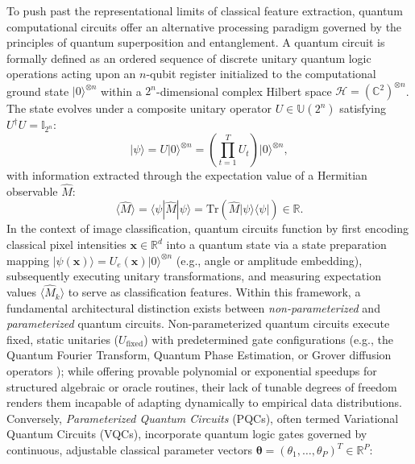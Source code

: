 \documentclass[journal]{IEEEtran}
\begin{document}
To push past the representational limits of classical feature extraction, quantum computational circuits offer an alternative processing paradigm governed by the principles of quantum superposition and entanglement. A quantum circuit is formally defined as an ordered sequence of discrete unitary quantum logic operations acting upon an $n$-qubit register initialized to the computational ground state $|0\rangle^{\otimes n}$ within a $2^n$-dimensional complex Hilbert space $\mathcal{H} = (\mathbb{C}^2)^{\otimes n}$. The state evolves under a composite unitary operator $U \in \mathbb{U}(2^n)$ satisfying $U^\dagger U = \mathbb{I}_{2^n}$:
\begin{equation}
|\psi\rangle = U |0\rangle^{\otimes n} = \left(\prod_{t=1}^T U_t\right) |0\rangle^{\otimes n},
\label{eq:quantum_circuit_evolution}
\end{equation}
with information extracted through the expectation value of a Hermitian observable $\hat{M}$:
\begin{equation}
\langle \hat{M} \rangle = \langle \psi | \hat{M} | \psi \rangle = \mathrm{Tr}\left(\hat{M} |\psi\rangle\langle\psi|\right) \in \mathbb{R}.
\label{eq:expectation_readout}
\end{equation}
In the context of image classification, quantum circuits function by first encoding classical pixel intensities $\mathbf{x} \in \mathbb{R}^d$ into a quantum state via a state preparation mapping $|\psi(\mathbf{x})\rangle = U_e(\mathbf{x}) |0\rangle^{\otimes n}$ (e.g., angle or amplitude embedding), subsequently executing unitary transformations, and measuring expectation values $\langle \hat{M}_k \rangle$ to serve as classification features. Within this framework, a fundamental architectural distinction exists between \textit{non-parameterized} and \textit{parameterized} quantum circuits. Non-parameterized quantum circuits execute fixed, static unitaries ($U_{\mathrm{fixed}}$) with predetermined gate configurations (e.g., the Quantum Fourier Transform, Quantum Phase Estimation, or Grover diffusion operators \cite{nielsen2010quantum}); while offering provable polynomial or exponential speedups for structured algebraic or oracle routines, their lack of tunable degrees of freedom renders them incapable of adapting dynamically to empirical data distributions. Conversely, \textit{Parameterized Quantum Circuits} (PQCs), often termed Variational Quantum Circuits (VQCs), incorporate quantum logic gates governed by continuous, adjustable classical parameter vectors $\boldsymbol{\theta} = (\theta_1, \dots, \theta_P)^T \in \mathbb{R}^P$:
\end{document}

